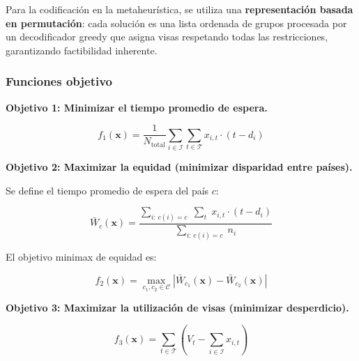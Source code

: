 \documentclass[12pt,letterpaper]{article}
\begin{document}
Para la codificación en la metaheurística, se utiliza una \textbf{representación basada en permutación}: cada solución es una lista ordenada de grupos procesada por un decodificador greedy que asigna visas respetando todas las restricciones, garantizando factibilidad inherente.

\subsubsection{Funciones objetivo}

\textbf{Objetivo 1: Minimizar el tiempo promedio de espera.}

\begin{formulabox}
\begin{equation}
f_1(\mathbf{x}) = \frac{1}{N_{\text{total}}} \sum_{i \in \mathcal{I}} \sum_{t \in \mathcal{T}} x_{i,t} \cdot (t - d_i)
\label{eq:obj1}
\end{equation}
\end{formulabox}

\textbf{Objetivo 2: Maximizar la equidad (minimizar disparidad entre países).}

Se define el tiempo promedio de espera del país $c$:

\begin{formulabox}
\begin{equation}
\bar{W}_c(\mathbf{x}) = \frac{\displaystyle\sum_{i:\, c(i)=c}\; \sum_{t}\; x_{i,t} \cdot (t - d_i)}{\displaystyle\sum_{i:\, c(i)=c}\; n_i}
\label{eq:wait_country}
\end{equation}
\end{formulabox}

El objetivo minimax de equidad es:

\begin{formulabox}
\begin{equation}
f_2(\mathbf{x}) = \max_{c_1, c_2 \in \mathcal{C}} \left| \bar{W}_{c_1}(\mathbf{x}) - \bar{W}_{c_2}(\mathbf{x}) \right|
\label{eq:obj2}
\end{equation}
\end{formulabox}

\textbf{Objetivo 3: Maximizar la utilización de visas (minimizar desperdicio).}

\begin{formulabox}
\begin{equation}
f_3(\mathbf{x}) = \sum_{t \in \mathcal{T}} \left( V_t - \sum_{i \in \mathcal{I}} x_{i,t} \right)
\label{eq:obj3}
\end{equation}
\end{formulabox}
\end{document}
